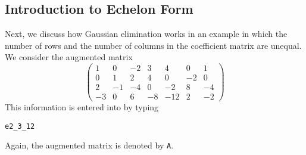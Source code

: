 \documentclass{ximera}
\begin{document}
\subsection*{Introduction to Echelon Form} 

Next, we discuss how Gaussian elimination works in an example
in which the number of rows and the number of columns in the
coefficient matrix are unequal.  We consider the augmented
matrix
\begin{equation*}  \label{examp5}
\left(
\begin{array}{rrrrrr|r}
 1  &  0  & -2  &  3  &  4  &  0  &  1\\
 0  &  1  &  2  &  4  &  0  & -2  &  0\\
 2  & -1  & -4  &  0  & -2  &  8  & -4\\
-3  &  0  &  6  & -8  &-12  &  2  & -2
\end{array}
\right)
\end{equation*}
This information is entered into \Matlab by typing
\begin{verbatim}
e2_3_12
\end{verbatim}
Again, the augmented matrix is denoted by {\tt A}.
\end{document}
